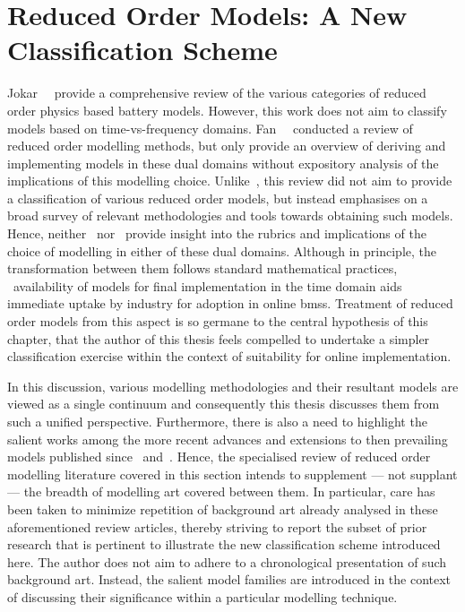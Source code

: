 \section{Reduced Order Models: A New Classification Scheme}

Jokar~\etal~\cite{Jokar2016}  provide  a  comprehensive review  of  the  various
categories  of  reduced  order  physics  based  battery  models.  However,  this
work  does  not aim  to  classify  models  based on  time-vs-frequency  domains.
Fan~\etal{}~\cite{Fan2015}  conducted  a  review   of  reduced  order  modelling
methods, but  only provide an  overview of  deriving and implementing  models in
these  dual domains  without expository  analysis  of the  implications of  this
modelling choice. Unlike~\cite{Jokar2016}, this review  did not aim to provide a
classification  of various  reduced order  models, but  instead emphasises  on a
broad survey of relevant methodologies  and tools towards obtaining such models.
Hence,  neither~\cite{Jokar2016}  nor~\cite{Fan2015}  provide insight  into  the
rubrics and  implications of  the choice  of modelling in  either of  these dual
domains. Although in principle, the transformation between them follows standard
mathematical  practices, ~availability of  models for
final implementation  in the time domain  aids immediate uptake by  industry for
adoption  in online  \gls{bms}s. Treatment  of  reduced order  models from  this
aspect  is so  germane to  the central  hypothesis of  this chapter, that  the author  of this  thesis feels
compelled to undertake  a simpler classification exercise within  the context of
suitability for online implementation.


In this discussion,  various modelling methodologies and  their resultant models
are viewed  as a single  continuum and  consequently this thesis  discusses them
from such a unified perspective. Furthermore,  there is also a need to highlight
the  salient  works among  the  more  recent  advances  and extensions  to  then
prevailing  models published  since~\cite{Jokar2016} and~\cite{Fan2015}.  Hence,
the specialised  review of  reduced order modelling  literature covered  in this
section intends to supplement --- not  supplant --- the breadth of modelling art
covered between them. In particular, care  has been taken to minimize repetition
of  background art  already analysed  in these  aforementioned review  articles,
thereby striving  to report the  subset of prior  research that is  pertinent to
illustrate the  new classification scheme  introduced here. The author  does not
aim to adhere  to a chronological presentation of such  background art. Instead,
the salient  model families are  introduced in  the context of  discussing their
significance within a particular modelling technique.



